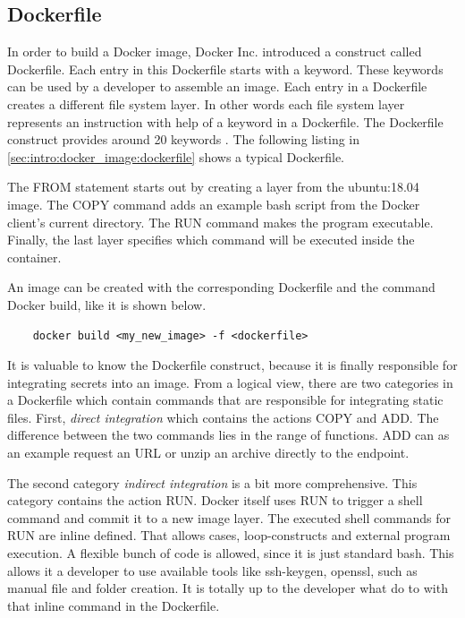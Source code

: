 \subsection{Dockerfile}
\label{sec:intro:docker_image:docker_img:dockerfile}
In order to build a Docker image, Docker Inc. introduced a construct called Dockerfile.
Each entry in this Dockerfile starts with a keyword. These keywords can be used by a developer to assemble an image. Each entry in a Dockerfile creates a different file system layer. In other words each file system layer represents an instruction with help of a keyword in a Dockerfile.
The Dockerfile construct provides around 20 keywords \cite{dockerfile_ref}.
The following listing in \ref{sec:intro:docker_image:dockerfile} shows a typical Dockerfile.

The FROM statement starts out by creating a layer from the ubuntu:18.04 image. The COPY command adds an example bash script from the Docker client’s current directory. The RUN command makes the program executable. Finally, the last layer specifies which command will be executed inside the container.

An image can be created with the corresponding Dockerfile and the command Docker build, like it is shown below.
\begin{lstlisting}
	docker build <my_new_image> -f <dockerfile>
\end{lstlisting}
It is valuable to know the Dockerfile construct, because it is finally responsible for integrating secrets into an image. 
From a logical view, there are two categories in a Dockerfile which contain commands that are responsible for integrating static files.
First, \textit{direct integration} which contains the actions COPY and ADD. The difference between the two commands lies in the range of functions. ADD can as an example request an URL or unzip an archive directly to the endpoint.

The second category \textit{indirect integration} is a bit more comprehensive. This category contains the action RUN.
Docker itself uses RUN to trigger a shell command and commit it to a new image layer.
The executed shell commands for RUN are inline defined. That allows cases, loop-constructs and external program execution. A flexible bunch of code is allowed, since it is just standard bash. This allows it a developer to use available tools like ssh-keygen, openssl, such as manual file and folder creation. It is totally up to the developer what do to with that inline command in the Dockerfile. 


